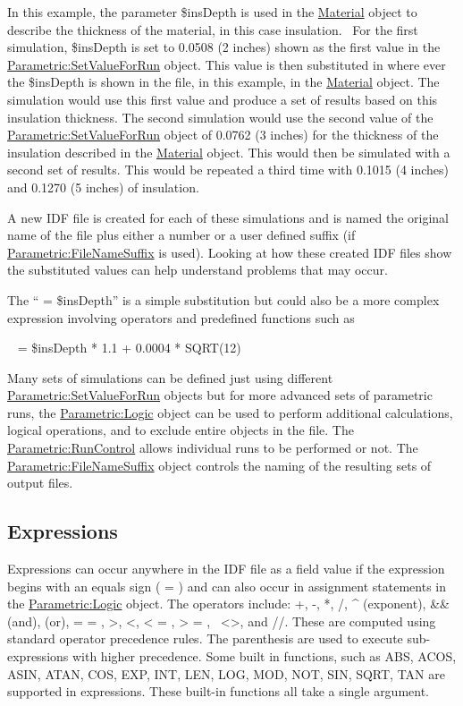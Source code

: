In this example, the parameter \$insDepth is used in the \hyperref[material]{Material} object to describe the thickness of the material, in this case insulation.~ For the first simulation, \$insDepth is set to 0.0508 (2 inches) shown as the first value in the \hyperref[parametricsetvalueforrun]{Parametric:SetValueForRun} object. This value is then substituted in where ever the \$insDepth is shown in the file, in this example, in the \hyperref[material]{Material} object. The simulation would use this first value and produce a set of results based on this insulation thickness. The second simulation would use the second value of the \hyperref[parametricsetvalueforrun]{Parametric:SetValueForRun} object of 0.0762 (3 inches) for the thickness of the insulation described in the \hyperref[material]{Material} object. This would then be simulated with a second set of results. This would be repeated a third time with 0.1015 (4 inches) and 0.1270 (5 inches) of insulation.

A new IDF file is created for each of these simulations and is named the original name of the file plus either a number or a user defined suffix (if \hyperref[parametricfilenamesuffix]{Parametric:FileNameSuffix} is used). Looking at how these created IDF files show the substituted values can help understand problems that may occur.

The `` = \$insDepth'' is a simple substitution but could also be a more complex expression involving operators and predefined functions such as

~ = \$insDepth * 1.1 + 0.0004 * SQRT(12)

Many sets of simulations can be defined just using different \hyperref[parametricsetvalueforrun]{Parametric:SetValueForRun} objects but for more advanced sets of parametric runs, the \hyperref[parametriclogic]{Parametric:Logic} object can be used to perform additional calculations, logical operations, and to exclude entire objects in the file. The \hyperref[parametricruncontrol]{Parametric:RunControl} allows individual runs to be performed or not. The \hyperref[parametricfilenamesuffix]{Parametric:FileNameSuffix} object controls the naming of the resulting sets of output files.

\subsection{Expressions}\label{expressions}

Expressions can occur anywhere in the IDF file as a field value if the expression begins with an equals sign ( = ) and can also occur in assignment statements in the \hyperref[parametriclogic]{Parametric:Logic} object. The operators include: +, -, *, /, \^{} (exponent), \&\& (and), \textbar{}\textbar{} (or), = = , \textgreater{}, \textless{}, \textless{} = , \textgreater{} = ,~ \textless{}\textgreater{}, and //. These are computed using standard operator precedence rules. The parenthesis are used to execute sub-expressions with higher precedence. Some built in functions, such as ABS, ACOS, ASIN, ATAN, COS, EXP, INT, LEN, LOG, MOD, NOT, SIN, SQRT, TAN are supported in expressions. These built-in functions all take a single argument.

